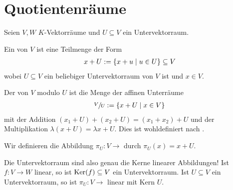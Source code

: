 \section{Quotientenräume}

Seien $V,W$ $K$-Vektorräume und $U\subseteq V$ ein Untervektorraum.

\begin{definition}
	Ein  von $V$ ist eine Teilmenge der Form 
	\begin{align}
		x+U:=\{x+u\mid u \in U\}\subseteq V\notag
	\end{align}
	wobei $U\subseteq V$ ein beliebiger Untervektorraum von $V$ ist und $x\in V$.
\end{definition}

\begin{definition}[Quotientenraum]
	Der  von $V$ modulo $U$ ist die Menge der affinen Unterräume
	\begin{align}
		\sfrac{V}{U}:=\{x+U\mid x\in V\}\notag
	\end{align}
	mit der Addition $(x_1+U)+(x_2+U)=(x_1+x_2)+U$ und der Multiplikation $\lambda(x+U)=\lambda x+U$. Dies ist 
	wohldefiniert nach .
	
	Wir definieren die Abbildung $\pi_U:V\to$  durch $\pi_U(x)=x+U$.
\end{definition}

\begin{remark}
	Die Untervektorraum sind also genau die Kerne linearer Abbildungen! Ist $f:V\to W$ linear, so ist $\operatorname{Ker}(f)\subseteq V$ ein Untervektorraum. 
	Ist $U\subseteq V$ ein Untervektorraum, so ist $\pi_U:V\to$ linear mit Kern $U$.
\end{remark}


